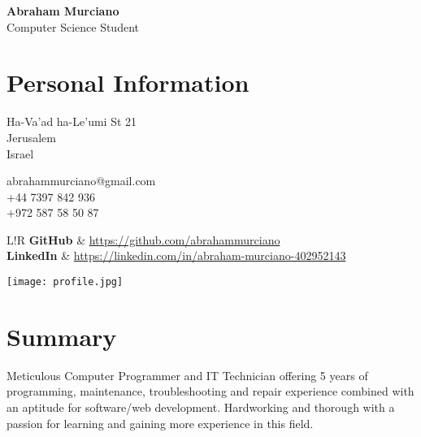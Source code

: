 \documentclass{article}
\newcommand\VRule{\color{lightgray}\vrule width 0.4pt}
\begin{document}
\hspace{-18.4pt}
\begin{minipage}{0.8\textwidth}
	{\bfseries\Huge Abraham Murciano}\vspace{4pt}\\
	{\large Computer Science Student}

	\section*{Personal Information}
	\begin{multicols}{2}
		Ha-Va'ad ha-Le'umi St 21\\
		Jerusalem\\
		Israel
		\columnbreak

		abrahammurciano@gmail.com\\
		+44 7397 842 936\\
		+972 587 58 50 87
		\columnbreak
	\end{multicols}
	\begin{tabular}{L!{\VRule}R}
		\textbf{GitHub}   & \url{https://github.com/abrahammurciano}                 \\
		\textbf{LinkedIn} & \url{https://linkedin.com/in/abraham-murciano-402952143}
	\end{tabular}
\end{minipage}
%
\begin{minipage}{0.2\textwidth}
	\begin{flushright}
		\texttt{[image: profile.jpg]}
	\end{flushright}
\end{minipage}

\section*{Summary}
Meticulous Computer Programmer and IT Technician offering 5 years of programming, maintenance, troubleshooting and repair experience combined with an aptitude for software/web development. Hardworking and thorough with a passion for learning and gaining more experience in this field.
\end{document}
